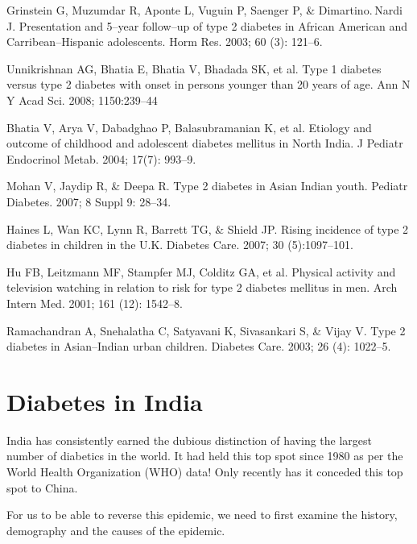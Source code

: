 \begin{thebibliography}{99}
 Grinstein G, Muzumdar R, Aponte L, Vuguin P, Saenger P, \& Dimartino. Nardi J. Presentation and 5–year follow–up of type 2 diabetes in African American and Carribean–Hispanic adolescents. Horm Res. 2003; 60 (3): 121–6.

  Unnikrishnan AG, Bhatia E, Bhatia V, Bhadada SK, et al. Type 1 diabetes versus type 2 diabetes with onset in persons younger than 20 years of age. Ann N Y Acad Sci. 2008; 1150:239–44

  Bhatia V, Arya V, Dabadghao P, Balasubramanian K, et al. Etiology and outcome of childhood and adolescent diabetes mellitus in North India. J Pediatr Endocrinol Metab. 2004; 17(7): 993–9.

  Mohan V, Jaydip R, \& Deepa R. Type 2 diabetes in Asian Indian youth. Pediatr Diabetes. 2007; 8 Suppl 9: 28–34.

  Haines L, Wan KC, Lynn R, Barrett TG, \& Shield JP. Rising incidence of type 2 diabetes in children in the U.K. Diabetes Care. 2007; 30 (5):1097–101.

  Hu FB, Leitzmann MF, Stampfer MJ, Colditz GA, et al. Physical activity and television watching in relation to risk for type 2 diabetes mellitus in men. Arch Intern Med. 2001; 161 (12): 1542–8.

  Ramachandran A, Snehalatha C, Satyavani K, Sivasankari S, \& Vijay V. Type 2 diabetes in Asian–Indian urban children. Diabetes Care. 2003; 26 (4): 1022–5.

 \end{thebibliography}


\chapter{Diabetes in India}


India has consistently earned the dubious distinction of having the largest number of diabetics in the world. It had held this top spot since 1980 as per the World Health Organization (WHO) data! Only recently has it conceded this top spot to China.

For us to be able to reverse this epidemic, we need to first examine the history, demography and the causes of the epidemic.

